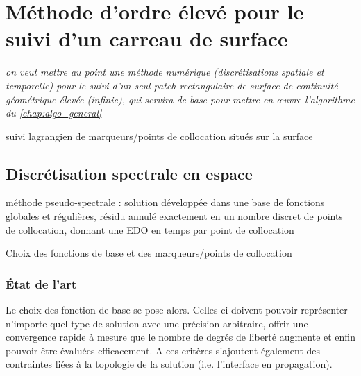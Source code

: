 \chapter{Méthode d'ordre élevé pour le suivi d'un carreau de surface}%
\label{chap:methode_ps}

\textit{on veut mettre au point une méthode numérique (discrétisations spatiale et temporelle) pour le suivi d'un seul patch rectangulaire de surface de continuité géométrique élevée (infinie), qui servira de base pour  mettre en \oe uvre l'algorithme du \autoref{chap:algo_general}}
\par\bigskip

suivi lagrangien de marqueurs/points de collocation situés sur la surface

\section{Discrétisation spectrale en espace}%
méthode pseudo-spectrale : solution développée dans une base de fonctions globales et régulières, résidu annulé exactement en un nombre discret de points de collocation, donnant une EDO en temps par point de collocation\par
Choix des fonctions de base et des marqueurs/points de collocation\par

\subsection{État de l'art}
Le choix des fonction de base se pose alors. Celles-ci doivent pouvoir représenter n'importe quel type de solution avec une précision arbitraire, offrir une convergence rapide à mesure que le nombre de degrés de liberté augmente et enfin pouvoir être évaluées efficacement. A ces critères s'ajoutent également des contraintes liées à la topologie de la solution (i.e. l'interface en propagation).\par

